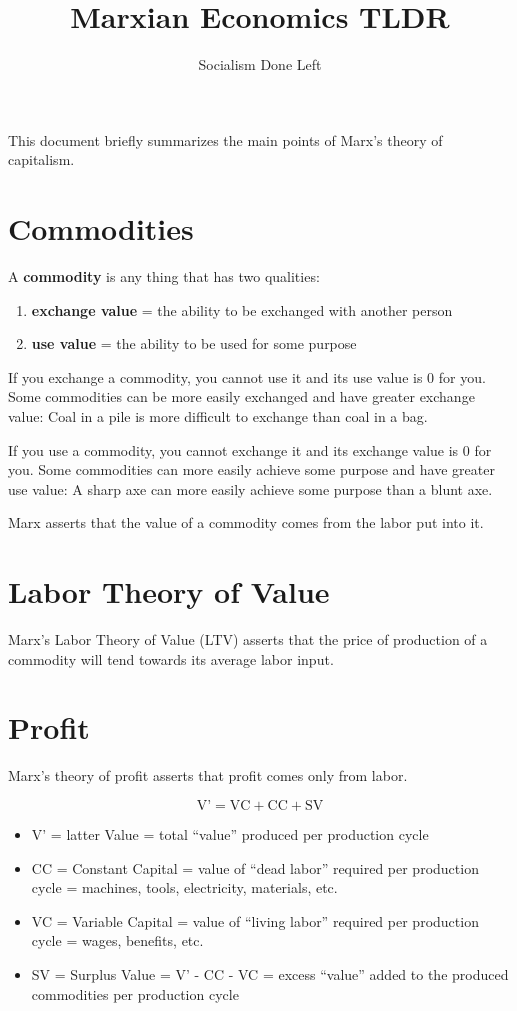 \documentclass[a4paper]{article}
\title{Marxian Economics TLDR}
\author{Socialism Done Left}
\begin{document}
\maketitle

This document briefly summarizes the main points of Marx's theory of capitalism.

\section{Commodities}

A \textbf{commodity} is any thing that has two qualities:

\begin{enumerate}
\item \textbf{exchange value} = the ability to be exchanged with another person
\item \textbf{use value} = the ability to be used for some purpose
\end{enumerate}

If you exchange a commodity, you cannot use it and its use value is 0 for you. Some commodities can be more easily exchanged and have greater exchange value: Coal in a pile is more difficult to exchange than coal in a bag.

If you use a commodity, you cannot exchange it and its exchange value is 0 for you. Some commodities can more easily achieve some purpose and have greater use value: A sharp axe can more easily achieve some purpose than a blunt axe.

Marx asserts that the value of a commodity comes from the labor put into it.

\section{Labor Theory of Value}
Marx's Labor Theory of Value (LTV) asserts that the price of production of a commodity will tend towards its average labor input.

\section{Profit}
Marx's theory of profit asserts that profit comes only from labor.

\[ \text{V'} = \text{VC} + \text{CC} + \text{SV} \]

\begin{itemize}
\item V' = latter Value = total ``value'' produced per production cycle
\item CC = Constant Capital = value of ``dead labor'' required per production cycle = machines, tools, electricity, materials, etc.
\item VC = Variable Capital = value of ``living labor'' required per production cycle = wages, benefits, etc.
\item SV = Surplus Value = V' - CC - VC = excess ``value'' added to the produced commodities per production cycle
\end{itemize}
\end{document}
